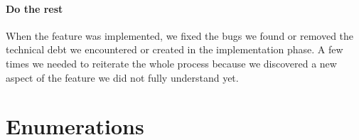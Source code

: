 \documentclass[nolot,nolof,nocover,printed]{fithesis3}
\begin{document}
\paragraph{Do the rest} When the feature was implemented, we fixed the bugs we found or removed the technical debt we encountered or created in the implementation phase. A few times we needed to reiterate the whole process because we discovered a new aspect of the feature we did not fully understand yet.




	


\section{Enumerations}



%






\end{document}
